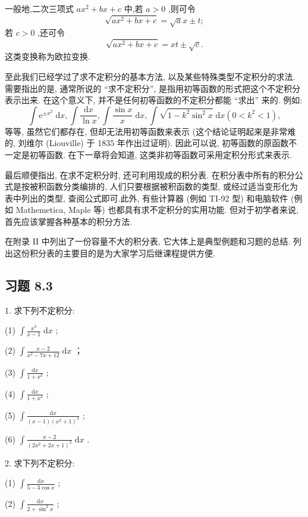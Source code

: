 一般地,二次三项式 \(a{x}^{2} + {bx} + c\) 中,若 \(a > 0\) ,则可令
\[
\sqrt{a{x}^{2} + {bx} + c} = \sqrt{a}x \pm  t;
\]
若 \(c > 0\) ,还可令
\[
\sqrt{a{x}^{2} + {bx} + c} = {xt} \pm  \sqrt{c}.
\]
这类变换称为欧拉变换.

至此我们已经学过了求不定积分的基本方法, 以及某些特殊类型不定积分的求法. 需要指出的是, 通常所说的 “求不定积分”, 是指用初等函数的形式把这个不定积分表示出来. 在这个意义下, 并不是任何初等函数的不定积分都能 “求出” 来的. 例如:
\[
\int {\mathrm{e}}^{\pm {x}^{2}}\mathrm{\;d}x,\int \frac{\mathrm{d}x}{\ln x},\int \frac{\sin x}{x}\mathrm{\;d}x,\int \sqrt{1 - {k}^{2}{\sin }^{2}x}\mathrm{\;d}x\left( {0 < {k}^{2} < 1}\right) ,
\]
等等, 虽然它们都存在, 但却无法用初等函数来表示 (这个结论证明起来是非常难的, 刘维尔 (Liouville) 于 1835 年作出过证明). 因此可以说, 初等函数的原函数不一定是初等函数. 在下一章将会知道, 这类非初等函数可采用定积分形式来表示.

最后顺便指出, 在求不定积分时, 还可利用现成的积分表. 在积分表中所有的积分公式是按被积函数分类编排的, 人们只要根据被积函数的类型, 或经过适当变形化为表中列出的类型, 查阅公式即可.此外, 有些计算器 (例如 TI-92 型) 和电脑软件 (例如 Mathemetica, Maple 等) 也都具有求不定积分的实用功能. 但对于初学者来说, 首先应该掌握各种基本的积分方法.

在附录 II 中列出了一份容量不大的积分表, 它大体上是典型例题和习题的总结. 列出这份积分表的主要目的是为大家学习后继课程提供方便.

\subsection{习题 8.3}

1. 求下列不定积分:

(1) \(\int \frac{{x}^{3}}{x - 1}\mathrm{\;d}x\) ;

(2) \(\int \frac{x - 2}{{x}^{2} - {7x} + {12}}\mathrm{\;d}x\) ；

(3) \(\int \frac{\mathrm{d}x}{1 + {x}^{3}}\) ;

(4) \(\int \frac{\mathrm{d}x}{1 + {x}^{4}}\) ;

(5) \(\int \frac{\mathrm{d}x}{\left( {x - 1}\right) {\left( {x}^{2} + 1\right) }^{2}}\) ;

(6) \(\int \frac{x - 2}{{\left( 2{x}^{2} + 2x + 1\right) }^{2}}\mathrm{\;d}x\) .

2. 求下列不定积分:

(1) \(\int \frac{\mathrm{d}x}{5 - 3\cos x}\) ;

(2) \(\int \frac{\mathrm{d}x}{2 + {\sin }^{2}x}\) ;

